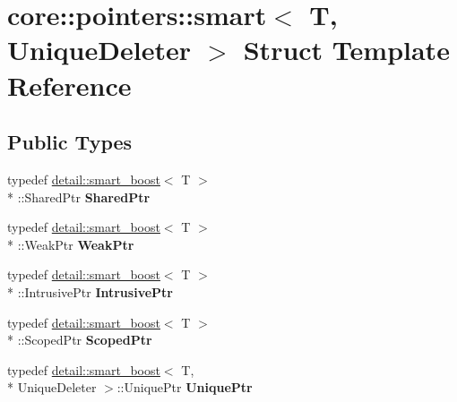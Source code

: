 \hypertarget{structcore_1_1pointers_1_1smart}{\section{core\-:\-:pointers\-:\-:smart$<$ T, Unique\-Deleter $>$ Struct Template Reference}
\label{structcore_1_1pointers_1_1smart}
}
\subsection*{Public Types}
\begin{DoxyCompactItemize}
\item 
\hypertarget{structcore_1_1pointers_1_1smart_a3de6b4003d9aa48e8593d0f74793c450}{typedef \hyperlink{structcore_1_1pointers_1_1detail_1_1smart__boost}{detail\-::smart\-\_\-boost}$<$ T $>$\\*
\-::Shared\-Ptr {\bfseries Shared\-Ptr}}\label{structcore_1_1pointers_1_1smart_a3de6b4003d9aa48e8593d0f74793c450}

\item 
\hypertarget{structcore_1_1pointers_1_1smart_a12118db6cd2953405b6ce106653c764b}{typedef \hyperlink{structcore_1_1pointers_1_1detail_1_1smart__boost}{detail\-::smart\-\_\-boost}$<$ T $>$\\*
\-::Weak\-Ptr {\bfseries Weak\-Ptr}}\label{structcore_1_1pointers_1_1smart_a12118db6cd2953405b6ce106653c764b}

\item 
\hypertarget{structcore_1_1pointers_1_1smart_ac2b31b7b53fc0b150d59e18aac14eee1}{typedef \hyperlink{structcore_1_1pointers_1_1detail_1_1smart__boost}{detail\-::smart\-\_\-boost}$<$ T $>$\\*
\-::Intrusive\-Ptr {\bfseries Intrusive\-Ptr}}\label{structcore_1_1pointers_1_1smart_ac2b31b7b53fc0b150d59e18aac14eee1}

\item 
\hypertarget{structcore_1_1pointers_1_1smart_a1e63a5453bb9cb14ae4f224ad1f22d2d}{typedef \hyperlink{structcore_1_1pointers_1_1detail_1_1smart__boost}{detail\-::smart\-\_\-boost}$<$ T $>$\\*
\-::Scoped\-Ptr {\bfseries Scoped\-Ptr}}\label{structcore_1_1pointers_1_1smart_a1e63a5453bb9cb14ae4f224ad1f22d2d}

\item 
\hypertarget{structcore_1_1pointers_1_1smart_a2c59febb2f89714017d9a3261fcc01e7}{typedef \hyperlink{structcore_1_1pointers_1_1detail_1_1smart__boost}{detail\-::smart\-\_\-boost}$<$ T, \\*
Unique\-Deleter $>$\-::Unique\-Ptr {\bfseries Unique\-Ptr}}\label{structcore_1_1pointers_1_1smart_a2c59febb2f89714017d9a3261fcc01e7}


\end{DoxyCompactItemize}
